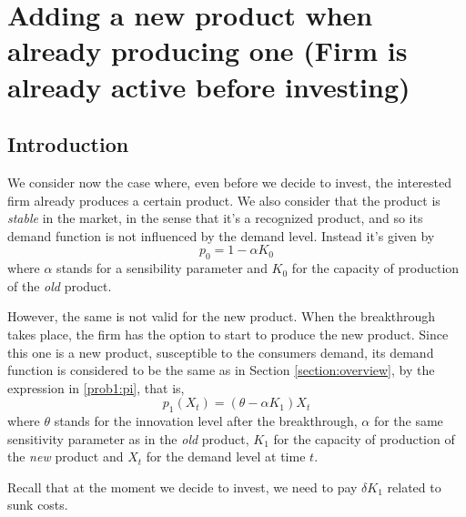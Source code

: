 
\chapter{Adding a new product when already producing one (Firm is already active before investing)}
\label{chapter:2}



\section{Introduction}
\label{section:2_intro}

We consider now the case where, even before we decide to invest, the interested firm already produces a certain product. We also consider that the product is \textit{stable} in the market, in the sense that it's a recognized product, and so its demand function is not influenced by the demand level. Instead it's given by
$$p_0=1-\alpha K_0 $$
where $\alpha$ stands for a sensibility parameter and $K_0$ for the capacity of production of the \textit{old} product. 

However, the same is not valid for the new product. When the breakthrough takes place, the firm has the option to start to produce the new product. Since this one is a new product, susceptible to the consumers demand, its demand function is considered to be the same as in Section \ref{section:overview}, by the expression in \eqref{prob1:pi}, that is,
$$ p_1(X_t)=(\theta-\alpha K_1)X_t $$
where $\theta$ stands for the innovation level after the breakthrough, $\alpha$ for the same sensitivity parameter as in the \textit{old} product, $K_1$ for the capacity of production of the \textit{new} product and $X_t$ for the demand level at time $t$.

Recall that at the moment we decide to invest, we need to pay $\delta K_1$ related to sunk costs. 



